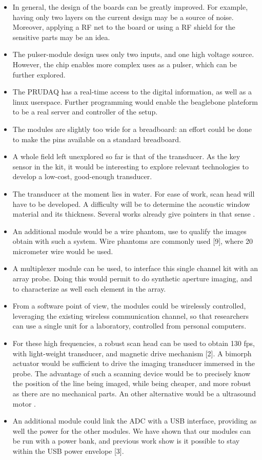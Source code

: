 \documentclass[letterpaper, 10 pt, conference]{ieeeconf} %
\begin{document}
\begin{itemize}
\item In general, the design of the boards can be greatly improved. For example, having only two layers on the current design may be a source of noise. Moreover, applying a RF net to the board or using a RF shield for the sensitive parts may be an idea.
\item The pulser-module design uses only two inputs, and one high voltage source. However, the chip enables more complex uses as a pulser, which can be further explored.
\item The PRUDAQ has a real-time access to the digital information, as well as a linux userspace. Further programming would enable the beaglebone plateform to be a real server and controller of the setup.
\item The modules are slightly too wide for a breadboard: an effort could be done to make the pins available on a standard breadboard.
\item A whole field left unexplored so far is that of the transducer. As the key sensor in the kit, it would be interesting to explore relevant technologies to develop a low-cost, good-enough transducer.
\item The transducer at the moment lies in water. For ease of work, scan head will have to be developed. A difficulty will be to determine the acoustic window material and its thickness. Several works already give pointers in that sense \cite{c1}.
\item An additional module would be a wire phantom, use to qualify the images obtain with such a system. Wire phantoms are commonly used [9], where 20 micrometer wire would be used.
\item A multiplexer module can be used, to interface this single channel kit with an array probe. Doing this would permit to do synthetic aperture imaging, and to characterize as well each element in the array.
\item From a software point of view, the modules could be wirelessly controlled, leveraging the existing wireless communication channel, so that researchers can use a single unit for a laboratory, controlled from personal computers.
\item For these high frequencies, a robust scan head can be used to obtain 130 fps, with light-weight transducer, and magnetic drive mechanism [2]. A bimorph actuator would be sufficient to drive the imaging transducer \cite{c4,c5} immersed in the probe. The advantage of such a scanning device would be to precisely know the position of the line being imaged, while being cheaper, and more robust as there are no mechanical parts. An other alternative would be a ultrasound motor \cite{c6}.
\item An additional module could link the ADC with a USB interface, providing as well the power for the other modules. We have shown that our modules can be run with a power bank, and previous work show is it possible to stay within the USB power envelope [3].
\end{itemize}
\end{document}
